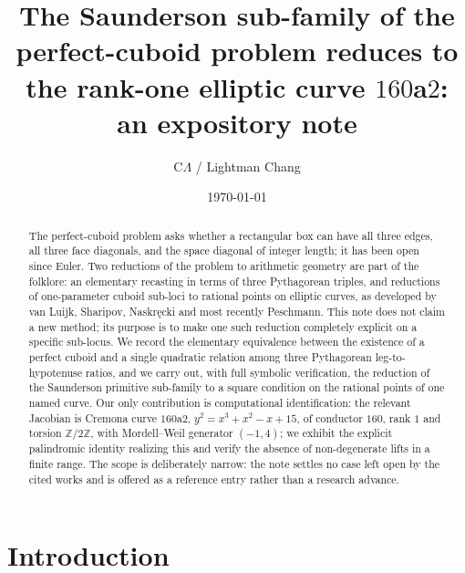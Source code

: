 \documentclass[11pt,reqno]{amsart}
\theoremstyle{plain}
\theoremstyle{definition}
\newcommand{\Z}{\mathbb{Z}}
\begin{document}
\title[A named elliptic curve for the Saunderson cuboid sub-family]{The Saunderson sub-family of the perfect-cuboid
problem reduces to the rank-one elliptic curve $160$a$2$: an expository note}

\author{C$\Lambda$ / Lightman Chang}
\address{Independent Researcher}

\date{\today}



\begin{abstract}
The perfect-cuboid problem asks whether a rectangular box can have all three
edges, all three face diagonals, and the space diagonal of integer length;
it has been open since Euler. Two reductions of the problem to arithmetic
geometry are part of the folklore: an elementary recasting in terms of three
Pythagorean triples, and reductions of one-parameter cuboid sub-loci to
rational points on elliptic curves, as developed by van Luijk, Sharipov,
Naskr\k{e}cki and most recently Peschmann. This note does not claim a new
method; its purpose is to make one such reduction completely explicit on a
specific sub-locus. We record the elementary equivalence between the existence
of a perfect cuboid and a single quadratic relation among three Pythagorean
leg-to-hypotenuse ratios, and we carry out, with full symbolic verification,
the reduction of the Saunderson primitive sub-family to a square condition on
the rational points of one named curve. Our only contribution is computational
identification: the relevant Jacobian is Cremona curve $160$a$2$,
$y^2=x^3+x^2-x+15$, of conductor $160$, rank $1$ and torsion $\Z/2\Z$, with
Mordell--Weil generator $(-1,4)$; we exhibit the explicit palindromic identity
realizing this and verify the absence of non-degenerate lifts in a finite
range. The scope is deliberately narrow: the note settles no case left open
by the cited works and is offered as a reference entry rather than a research
advance.
\end{abstract}

\maketitle

\section{Introduction}\label{sec:intro}
\end{document}
